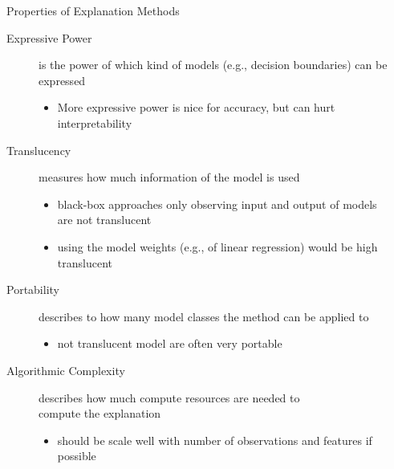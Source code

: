 \documentclass[aspectratio=169]{../latex_main/tntbeamer}  %
\begin{document}
\begin{frame}[c]{Properties of Explanation Methods }
	
	\begin{description}
        \item[Expressive Power] is the power of which kind of models (e.g., decision boundaries) can be expressed 
        \begin{itemize}
            \item More expressive power is nice for accuracy, but can hurt interpretability
        \end{itemize}
        \medskip
        \pause
        \item[Translucency] measures how much information of the model is used
        \begin{itemize}
            \item black-box approaches only observing input and output of models\\ are not translucent
            \item using the model weights (e.g., of linear regression) would be high translucent
        \end{itemize}
        \medskip
        \pause
        \item[Portability] describes to how many model classes the method can be applied to
        \begin{itemize}
            \item not translucent model are often very portable
        \end{itemize}
        \medskip
        \pause
        \item[Algorithmic Complexity] describes how much compute resources are needed to\\ compute the explanation
        \begin{itemize}
            \item should be scale well with number of observations and features if possible
        \end{itemize}
        
	\end{description}
\end{frame}
\end{document}
